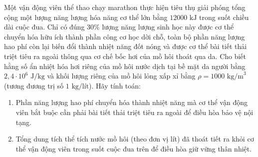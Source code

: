 \begin{ex}%
	Một vận động viên thể thao chạy marathon thực hiện tiêu thụ giải phóng tổng cộng một lượng năng lượng hóa năng cơ thể lớn bằng $12000\text{ kJ}$ trong suốt chiều dài cuộc đua. Chỉ có đúng $30\%$ lượng năng lượng sinh học này được cơ thể chuyển hóa hữu ích thành phần công cơ học dời chỗ, toàn bộ phần năng lượng hao phí còn lại biến đổi thành nhiệt năng đốt nóng và được cơ thể bài tiết thải triệt tiêu ra ngoài thông qua cơ chế bốc hơi của mồ hôi thoát qua da. Cho biết hằng số ẩn nhiệt hóa hơi riêng của mồ hôi nước dịch tại bề mặt da người bằng $2,4 \cdot 10^6\text{ J/kg}$ và khối lượng riêng của mồ hôi lỏng xấp xỉ bằng $\rho = 1000\text{ kg/m}^3$ (tương đương trị số $1\text{ kg/lít}$). Hãy tính toán:
	\begin{enumerate}
		\item[a)] Phần năng lượng hao phí chuyển hóa thành nhiệt năng mà cơ thể vận động viên bắt buộc cần phải bài tiết thải triệt tiêu ra ngoài để điều hòa bảo vệ nội tạng.
		\item[b)] Tổng dung tích thể tích nước mồ hôi (theo đơn vị lít) đã thoát tiết ra khỏi cơ thể vận động viên trong suốt cuộc đua trên để điều hòa giữ vững thân nhiệt.
	\end{enumerate}
\end{ex}

